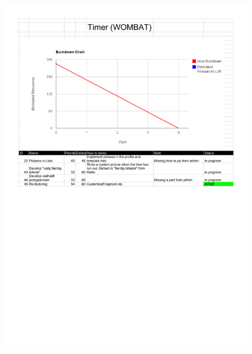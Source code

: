 \begin{center}
		\includegraphics[scale=0.5]{Development/burndown_charts/Sprint_5.pdf}
	\end{center}

